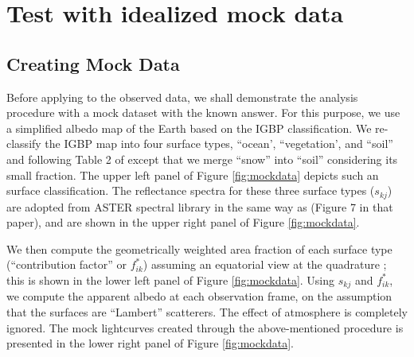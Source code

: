 \documentclass[iop,numberedappendix,apj,]{emulateapj}
\def\memoYF#1{\color{red}{\bf [#1]}\color{black}}
\begin{document}
\section{Test with idealized mock data}
\label{s:mockdata}

\subsection{Creating Mock Data}
\label{ss:createmockdata}


Before applying to the observed data, we shall demonstrate the analysis procedure with a mock dataset with the known answer. 
For this purpose, we use a simplified albedo map of the Earth based on the IGBP classification. 
We re-classify the IGBP map into four surface types, ``ocean', ``vegetation', and ``soil'' and following Table 2 of \citet{Fujii2010} except that we merge ``snow'' into ``soil'' considering its small fraction. 
The upper left panel of Figure \ref{fig:mockdata} depicts such an surface classification. 
The reflectance spectra for these three surface types ($s_{kj}$) are adopted from ASTER spectral library \citep{Baldridge2009} in the same way as \citet{Fujii2010} (Figure 7 in that paper), and are shown in the upper right panel of Figure \ref{fig:mockdata}. 

We then compute the geometrically weighted area fraction of each surface type (``contribution factor'' or $f^{\ast }_{ik}$) assuming an equatorial view at the quadrature \memoYF{Describe in more detail.}; this is shown in the lower left panel of Figure \ref{fig:mockdata}. 
Using $s_{kj}$ and $f^{\ast }_{ik}$, we compute the apparent albedo at each observation frame, on the assumption that the surfaces are ``Lambert'' scatterers. The effect of atmosphere is completely ignored. 
The mock lightcurves created through the above-mentioned procedure is presented in the lower right panel of Figure \ref{fig:mockdata}. 
\end{document}
